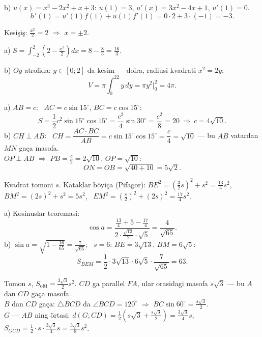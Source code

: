 b) $u(x)=x^3-2x^2+x+3$: $u(1)=3$, $u'(x)=3x^2-4x+1$, $u'(1)=0$.
\[h'(1)=u'(1)f(1)+u(1)f'(1)=0\cdot2+3\cdot(-1)=-3.\]

\newpage
{}
Kesişiş: $\frac{x^2}2=2$ $\Rightarrow$ $x=\pm2$.

a) $S=\displaystyle\int_{-2}^2\left(2-\frac{x^2}2\right)dx=8-\frac{8}3=\frac{16}3$.

b) $Oy$ atrofida: $y\in[0;2]$ da kesim — doira, radiusi kvadrati $x^2=2y$:
\[V=\pi\int_0^22y\,dy=\pi y^2\Big|_0^2=4\pi.\]

\newpage
{}
a) $AB=c$: \ $AC=c\sin15^\circ$, $BC=c\cos15^\circ$:
\[S=\frac12c^2\sin15^\circ\cos15^\circ=\frac{c^2}4\sin30^\circ=\frac{c^2}8=20\ \Rightarrow\ c=4\sqrt{10}.\]
b) $CH\perp AB$: \ $CH=\dfrac{AC\cdot BC}{AB}=c\sin15^\circ\cos15^\circ=\dfrac c4=\sqrt{10}$ — bu $AB$ vatardan $MN$ gaça masofa.\\
$OP\perp AB$ $\Rightarrow$ $PB=\frac c2=2\sqrt{10}$, $OP=\sqrt{10}$:
\[ON=OB=\sqrt{40+10}=5\sqrt2.\]

\newpage
{}
Kvadrat tomoni $s$. Kataklar böyiça (Pifagor): $BE^2=\left(\frac32s\right)^2+s^2=\frac{13}4s^2$, \ $BM^2=(2s)^2+s^2=5s^2$, \ $EM^2=\left(\frac s2\right)^2+(2s)^2=\frac{17}4s^2$.

a) Kosinuslar teoremasi:
\[\cos a=\frac{\frac{13}4+5-\frac{17}4}{2\cdot\frac{\sqrt{13}}2\cdot\sqrt5}=\frac4{\sqrt{65}}.\]
b) $\sin a=\sqrt{1-\frac{16}{65}}=\frac7{\sqrt{65}}$; \ $s=6$: $BE=3\sqrt{13}$, $BM=6\sqrt5$:
\[S_{BEM}=\frac12\cdot3\sqrt{13}\cdot6\sqrt5\cdot\frac7{\sqrt{65}}=63.\]

\newpage
{}
Tomon $s$, $S_{\text{olti}}=\frac{3\sqrt3}2s^2$. $CD$ ga parallel $FA$, ular orasidagi masofa $s\sqrt3$ — bu $A$ dan $CD$ gaça masofa.\\
$B$ dan $CD$ gaça: $\triangle BCD$ da $\angle BCD=120^\circ$ $\Rightarrow$ $BC\sin60^\circ=\frac{s\sqrt3}2$.\\
$G$ — $AB$ ning örtasi: $d(G;CD)=\frac12\left(s\sqrt3+\frac{s\sqrt3}2\right)=\frac{3\sqrt3}4s$, \ $S_{GCD}=\frac12\cdot s\cdot\frac{3\sqrt3}4s=\frac{3\sqrt3}8s^2$.

